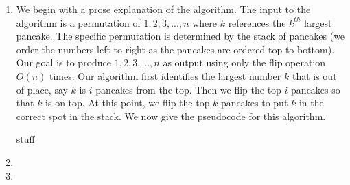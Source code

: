 \documentclass{article}
\begin{document}
\begin{enumerate}[label=\alph*.]
    \item We begin with a prose explanation of the algorithm.
    The input to the algorithm is a permutation of $1,2,3, ... , n$ where $k$ references the $k^{th}$ largest pancake.
    The specific permutation is determined by the stack of pancakes (we order the numbers left to right as the pancakes are ordered top to bottom).
    Our goal is to produce $1,2,3,..., n$ as output using only the flip operation $O(n)$ times. \parspace
    Our algorithm first identifies the largest number $k$ that is out of place, say $k$ is $i$ pancakes from the top.
    Then we flip the top $i$ pancakes so that $k$ is on top.
    At this point, we flip the top $k$ pancakes to put $k$ in the correct spot in the stack. \parspace
    We now give the pseudocode for this algorithm.
    \begin{algorithm}
        stuff
    \end{algorithm}
    \item
    \item
\end{enumerate}

\end{document}
